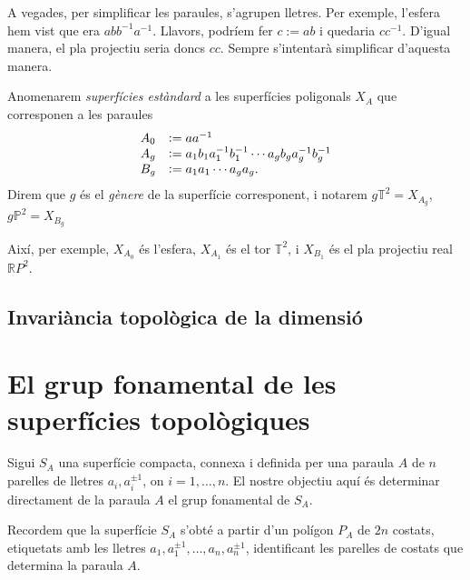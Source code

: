 \documentclass[../main.tex]{subfiles}
\begin{document}
\begin{nota}
A vegades, per simplificar les paraules, s'agrupen lletres. Per exemple, l'esfera hem vist que era $abb^{-1}a^{-1}$. Llavors, podríem fer $c:=ab$ i quedaria $cc^{-1}$. D'igual manera, el pla projectiu seria doncs $cc$. Sempre s'intentarà simplificar d'aquesta manera.
\end{nota}

\begin{defi}
\label{def:superficieestandard} Anomenarem \textit{superfícies estàndard} a les superfícies poligonals $X_A$ que corresponen a les paraules
\begin{equation}
    \notag
    \begin{array}{ll}
        A_0 & := aa^{-1} \\
        A_g & := a_1b_1a_1^{-1}b_1^{-1}\cdots a_gb_ga_g^{-1}b_g^{-1} \\
        B_g & := a_1a_1\cdots a_ga_g.
    \end{array}
\end{equation}
Direm que $g$ és el \textit{gènere}\label{def:genere} de la superfície corresponent, i notarem $g\mathbb{T}^2 = X_{A_g}$, $g\mathbb{P}^2=X_{B_g}$
\end{defi}

Així, per exemple, $X_{A_0}$ és l'esfera, $X_{A_1}$ és el tor $\mathbb{T}^2$, i $X_{B_1}$ és el pla projectiu real $\mathbb{R}P^2$. 






\subsection{Invariància topològica de la dimensió}







\section{El grup fonamental de les superfícies topològiques}
Sigui $S_A$ una superfície compacta, connexa i definida per una paraula $A$ de $n$ parelles de lletres $a_i,a_i^{\pm 1}$, on $i=1,\ldots,n$. El nostre objectiu aquí és determinar directament de la paraula $A$ el grup fonamental de $S_A$.

Recordem que la superfície $S_A$ s'obté a partir d'un polígon $P_A$ de $2n$ costats, etiquetats amb les lletres $a_1,a_1^{\pm 1},\ldots,a_n,a_n^{\pm1}$, identificant les parelles de costats que determina la paraula $A$.
\end{document}
